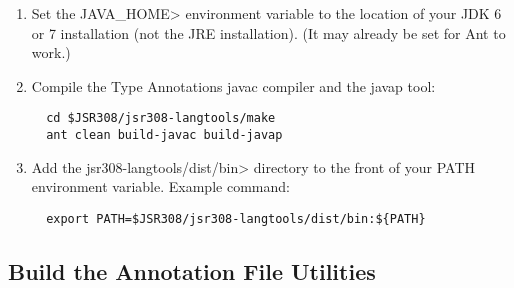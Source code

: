 \begin{enumerate}
\item
Set the \<JAVA\_HOME> environment variable to the location of your JDK 6 or
7 installation (not the JRE installation).  (It may already be set for Ant to work.)


\item
Compile the Type Annotations javac compiler and the javap tool:

\begin{Verbatim}
  cd $JSR308/jsr308-langtools/make
  ant clean build-javac build-javap
\end{Verbatim}

\item
 Add the \<jsr308-langtools/dist/bin> directory to the front of your PATH environment variable.
  Example command:

\begin{Verbatim}
  export PATH=$JSR308/jsr308-langtools/dist/bin:${PATH}
\end{Verbatim}

\end{enumerate}




\subsection{Build the Annotation File Utilities\label{afu-building}}

